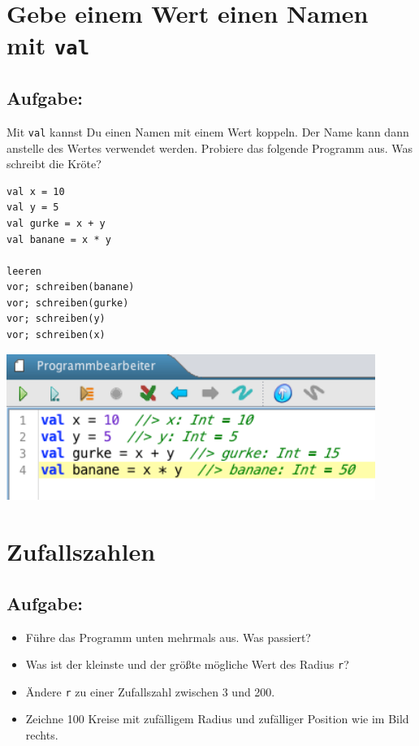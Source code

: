 \chapter{Gebe einem Wert einen Namen mit \lstinline{val}}
\begin{multicols}{2}
\section*{\color{BrickRed}Aufgabe:}
Mit \lstinline{val} kannst Du einen Namen mit einem Wert koppeln. Der Name kann dann anstelle des Wertes verwendet werden. Probiere das folgende Programm aus. Was schreibt die Kröte?

\begin{lstlisting}[numbers=none]
val x = 10
val y = 5
val gurke = x + y
val banane = x * y

leeren
vor; schreiben(banane)
vor; schreiben(gurke)
vor; schreiben(y)
vor; schreiben(x)
\end{lstlisting}
        

\columnbreak

\begin{center}
\includegraphics[width=12.0cm]{../img/val_de.png}
\end{center}

\end{multicols}

\chapter{Zufallszahlen}\section*{\color{BrickRed}Aufgabe:}


\begin{itemize}

\item {Führe das Programm unten mehrmals aus. Was passiert?}
\item {Was ist der kleinste und der größte mögliche Wert des Radius \lstinline{r}?}
\item {Ändere \lstinline{r} zu einer Zufallszahl zwischen 3 und 200.}
\item {Zeichne 100 Kreise mit zufälligem Radius und zufälliger Position wie im Bild rechts.}

\end{itemize}



